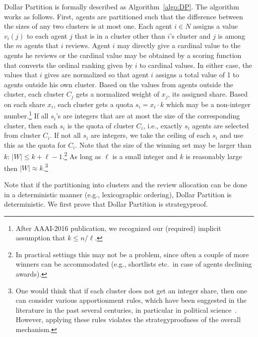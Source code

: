\documentclass[letterpaper]{article}
\begin{document}
Dollar Partition is formally described as Algorithm~\ref{algo:DP}. The algorithm works as follows. First, agents are partitioned such that the difference between the sizes of any two clusters is at most one. Each agent $i\in N$ assigns a value $v_i(j)$ to each agent $j$ that is in a cluster other than $i$'s cluster and $j$ is among the $m$ agents that $i$ reviews. Agent $i$ may directly give a cardinal value to the agents he reviews or the cardinal value may be obtained by a scoring function that converts the ordinal ranking given by $i$ to cardinal values. In either case, the values that $i$ gives are normalized so that agent $i$ assigns a total value of 1 to agents outside his own cluster. Based on the values from agents outside the cluster, each cluster $C_j$ gets a normalized weight of $x_j$, its assigned share. Based on each share $x_i$, each cluster gets a quota $s_i=x_i \cdot k$ which may be a non-integer number.\footnote{After AAAI-2016 publication, we recognized our (required) implicit assumption that $k \leq n/\ell$.}
If all $s_i$'s are integers that are at most the size of the corresponding cluster, then each $s_i$ is the quota of cluster $C_i$, i.e., exactly $s_i$ agents are selected from cluster $C_i$.
If not all $s_i$ are integers, we take the ceiling of each $s_i$ and use this as the quota for $C_i$.
Note that the size of the winning set may be larger than $k$: $|W| \leq k+\ell-1$.\footnote{In practical settings this may not be a problem, since often a couple of more winners can be accommodated (e.g., shortlists etc.\ in case of agents declining awards).}
As long as $\ell$ is a small integer and $k$ is reasonably large then $|W| \approx k$.\footnote{One would think that if each cluster does not get an integer share, then one can consider various apportionment rules, which have been suggested in the literature in the past several centuries, in particular in political science~\cite{Youn94a}. However, applying these rules violates the strategyproofness of the overall mechanism.}



Note that if the partitioning into clusters and the review allocation can be done in a deterministic manner (e.g., lexicographic ordering), Dollar Partition is deterministic. We first prove that Dollar Partition is strategyproof.
\end{document}
